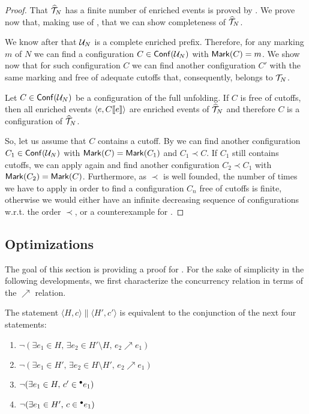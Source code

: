 \begin{proof}
That $\widehat{\mathcal{T}}_{N}$ has a finite number of enriched events is proved by
.  We prove now that, making use of , that we can
show completeness of $\widehat{\mathcal{T}}_{N}$.

We know after  that $\mathcal{U}_{N}$ is a complete enriched prefix.
Therefore, for any marking $m$ of $N$ we can find a configuration $C \in
\mathsf{Conf}(\mathcal{U}_{N})$ with $\mathsf{Mark }{(C)} = m$.  We show now that for such configuration
$C$ we can find another configuration $C'$ with the same marking and free of
adequate cutoffs that, consequently, belongs to $\mathcal{T}_{N}$.

Let $C \in \mathsf{Conf}(\mathcal{U}_{N})$ be a configuration of the full unfolding.  If $C$ is
free of cutoffs, then all enriched events $\langle e, C [\![ e]\!] \rangle$ are
enriched events of $\widehat{\mathcal{T}}_{N}$ and therefore $C$ is a configuration of
$\widehat{\mathcal{T}}_{N}$.

So, let us assume that $C$ contains a cutoff.  By  we can find
another configuration $C_1 \in \mathsf{Conf}(\mathcal{U}_{N})$ with $\mathsf{Mark }{(C)} = \mathsf{Mark }{(C_1)}$
and $C_1 \prec C$.  If $C_1$ still contains cutoffs, we can apply again
 and find another configuration $C_2 \prec C_1$ with $\mathsf{Mark }{(C_2)}
= \mathsf{Mark }{(C)}$.  Furthermore, as $\prec$ is well founded, the number of times
we have to apply  in order to find a configuration $C_n$ free of
cutoffs is finite,  otherwise we would either have an infinite decreasing
sequence of configurations w.r.t. the order $\prec$, or a counterexample for
.
\end{proof}

\subsection{Optimizations}

The goal of this section is providing a proof for .  For
the sake of simplicity in the following developments, we first characterize the
concurrency relation in terms of the $\nearrow$ relation.

\setcounter{theorem}{20}
\begin{remark}
\label{rmk:the.statement}
The statement $\langle H, c\rangle \parallel \langle H', c' \rangle$ is
equivalent to the conjunction of the next four statements:
\begin{enumerate}
\item $\lnot (\exists e_1 \in H,\, \exists e_2 \in H' \setminus H,\, e_2
\nearrow e_1)$
\item $\lnot (\exists e_1 \in H',\, \exists e_2 \in H \setminus H',\, e_2
\nearrow e_1)$
\item $\lnot (\exists e_1 \in H,\, c' \in {}^\bullet e_1)$
\item $\lnot (\exists e_1 \in H',\, c \in {}^\bullet e_1)$
\end{enumerate}
\end{remark}

